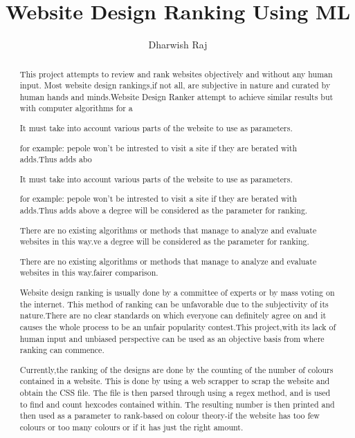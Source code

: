 \documentclass{fisatproject}
\title{Website Design Ranking Using ML}
\author{Dharwish Raj}
\begin{document}
\maketitle

\makecert

\newpage
\setcounter{page}{1}
\renewcommand\abstractname{ABSTRACT}
\begin{abstract}
\vspace{5cm}
This project attempts to review and rank websites objectively and without any human input. Most website design rankings,if not all, are subjective in nature and curated by human hands and minds.Website Design Ranker attempt to achieve similar results but with computer algorithms for a 	\item It must take into account various parts of the website to use as parameters.

\item for example: pepole won't be intrested to visit a site if they are berated with adds.Thus adds abo	\item It must take into account various parts of the website to use as parameters.

\item for example: pepole won't be intrested to visit a site if they are berated with adds.Thus adds above a degree will be considered as the parameter for ranking.

\item There are no existing algorithms or methods that manage to analyze and evaluate websites in this way.ve a degree will be considered as the parameter for ranking.

\item There are no existing algorithms or methods that manage to analyze and evaluate websites in this way.fairer comparison.

Website design ranking is usually done by a committee of experts or by mass voting on the internet. This method of ranking can be unfavorable due to the subjectivity of its nature.There are no clear standards on which everyone can definitely agree on and it causes the whole process to be an unfair popularity contest.This project,with its lack of human input and unbiased perspective can be used as an objective basis from where ranking can commence.

Currently,the ranking of the designs are done by the counting of the number of colours contained in a website. This is done by using a web scrapper to scrap the website and obtain the CSS file. The file is then parsed through using a regex method, and is used to find and count hexcodes contained within. The resulting number is then printed and then used as a parameter to rank-based on colour theory-if the website has too few colours or too many colours or if it has just the right amount.
\end{abstract}
\end{document}
